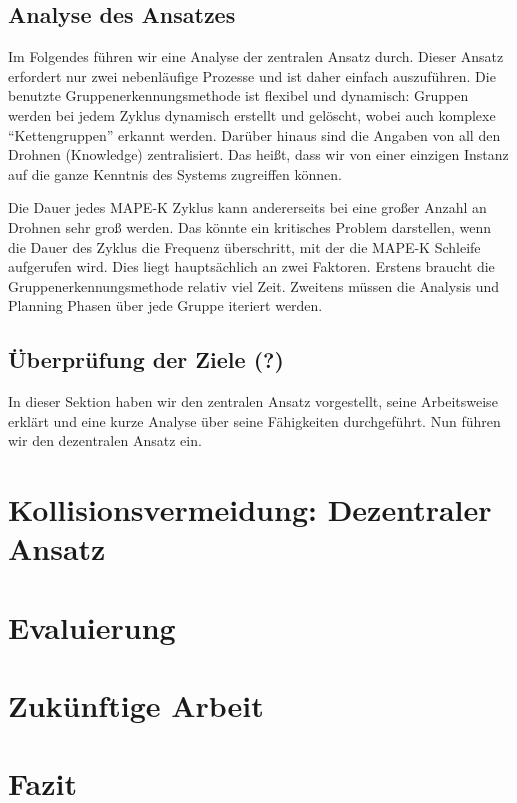 \documentclass[a4paper,titlepage,onecolumn,twoside,12pt]{article}
\begin{document}
\subsection{Analyse des Ansatzes}
\label{subsec:analysedesansatzes}

Im Folgendes führen wir eine Analyse der zentralen Ansatz durch. Dieser Ansatz erfordert nur zwei nebenläufige Prozesse und ist daher einfach auszuführen. Die benutzte Gruppenerkennungsmethode ist flexibel und dynamisch: Gruppen werden bei jedem Zyklus dynamisch erstellt und gelöscht, wobei auch komplexe "`Kettengruppen"' erkannt werden. Darüber hinaus sind die Angaben von all den Drohnen (Knowledge) zentralisiert. Das heißt, dass wir von einer einzigen Instanz auf die ganze Kenntnis des Systems zugreiffen können.

Die Dauer jedes MAPE-K Zyklus kann andererseits bei eine großer Anzahl an Drohnen sehr groß werden. Das könnte ein kritisches Problem darstellen, wenn die Dauer des Zyklus die Frequenz überschritt, mit der die MAPE-K  Schleife aufgerufen wird. Dies liegt hauptsächlich an zwei Faktoren. Erstens braucht die Gruppenerkennungsmethode relativ viel Zeit. Zweitens müssen die Analysis und Planning Phasen über jede Gruppe iteriert werden.

\subsection{Überprüfung der Ziele (?)}

In dieser Sektion haben wir den zentralen Ansatz vorgestellt, seine Arbeitsweise erklärt und eine kurze Analyse über seine Fähigkeiten durchgeführt. Nun führen wir den dezentralen Ansatz ein.

\section{Kollisionsvermeidung: Dezentraler Ansatz}
\label{sec:dezentral}
\section{Evaluierung}
\label{sec:evaluierung}
\section{Zukünftige Arbeit}
\label{sec:zukünftige}
\section{Fazit}
\label{sec:fazit}

%
%

\cleardoublepage
\newpage\thispagestyle{plain}
{}
{}
\nocite{*}

%
\end{document}
